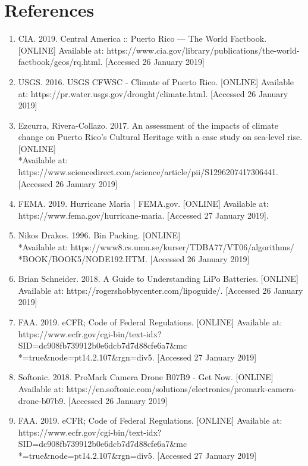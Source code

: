 \documentclass[a4paper,12pt]{article}
\begin{document}
\newpage

\section{References}

\begin{enumerate}
\item CIA. 2019. Central America :: Puerto Rico — The World Factbook. [ONLINE] Available at: https://www.cia.gov/library/publications/the-world-factbook/geos/rq.html. [Accessed 26 January 2019]
\item USGS. 2016. USGS CFWSC - Climate of Puerto Rico. [ONLINE] Available at: https://pr.water.usgs.gov/drought/climate.html. [Accessed 26 January 2019]
\item Ezcurra, Rivera-Collazo. 2017. An assessment of the impacts of climate change on Puerto Rico's Cultural Heritage with a case study on sea-level rise. [ONLINE] \\*Available at: https://www.sciencedirect.com/science/article/pii/S1296207417306441. [Accessed 26 January 2019]
\item FEMA. 2019. Hurricane Maria | FEMA.gov. [ONLINE] Available at: https://www.fema.gov/hurricane-maria. [Accessed 27 January 2019].
\item Nikos Drakos. 1996. Bin Packing. [ONLINE] \\*Available at: https://www8.cs.umu.se/kurser/TDBA77/VT06/algorithms/\\*BOOK/BOOK5/NODE192.HTM. [Accessed 26 January 2019]
\item Brian Schneider. 2018. A Guide to Understanding LiPo Batteries. [ONLINE] Available at: https://rogershobbycenter.com/lipoguide/. [Accessed 26 January 2019]
\item FAA. 2019. eCFR; Code of Federal Regulations. [ONLINE] Available at: https://www.ecfr.gov/cgi-bin/text-idx?SID=dc908fb739912b0e6dcb7d7d88cfe6a7\&mc\\*=true\&node=pt14.2.107\&rgn=div5. [Accessed 27 January 2019]
\item Softonic. 2018. ProMark Camera Drone B07B9 - Get Now. [ONLINE] Available at: https://en.softonic.com/solutions/electronics/promark-camera-drone-b07b9. [Accessed 26 January 2019]
\item FAA. 2019. eCFR; Code of Federal Regulations. [ONLINE] Available at: https://www.ecfr.gov/cgi-bin/text-idx?SID=dc908fb739912b0e6dcb7d7d88cfe6a7\&mc\\*=true\&node=pt14.2.107\&rgn=div5. [Accessed 27 January 2019]
\end{enumerate}
\end{document}
